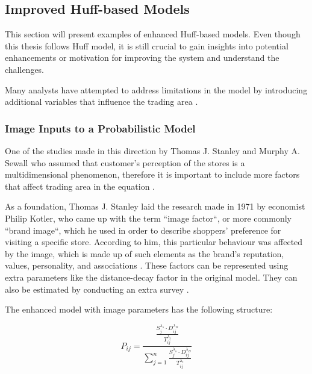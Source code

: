 \subsection{Improved Huff-based Models}

This section will present examples of enhanced Huff-based models. Even though this thesis follows Huff model, it is still crucial to gain insights into potential enhancements or motivation for improving the system and understand the challenges.

Many analysts have attempted to address limitations in the model by introducing additional variables that influence the trading area \cite{huff1966programmed}.

\subsubsection{Image Inputs to a Probabilistic Model}

One of the studies made in this direction by Thomas J. Stanley and Murphy A. Sewall who assumed that customer's perception of the stores is a multidimensional phenomenon, therefore it is important to include more factors that affect trading area in the equation \cite{stanley1976image}. 

As a foundation, Thomas J. Stanley laid the research made in 1971 by economist Philip Kotler, who came up with the term ``image factor``, or more commonly ``brand image``, which he used in order to describe shoppers' preference for visiting a specific store. According to him, this particular behaviour was affected by the image, which is made up of such elements as the brand's reputation, values, personality, and associations \cite{stanley1976image}. These factors can be represented using extra parameters like the distance-decay factor in the original model. They can also be estimated by conducting an extra survey \cite{stanley1976image}.

The enhanced model with image parameters has the following structure:

\begin{equation}
P_{ij}=\frac{ \frac{S_j^{\lambda_s} \cdot D_{ij}^{\lambda_D}}{T_{ij}^{\lambda_t}} }{ \sum_{j=1}^{n} \frac{S_j^{\lambda_s} \cdot D_{ij}^{\lambda_D}}{T_{ij}^{\lambda_t} } }
\label{SewallEquation}
\end{equation}

